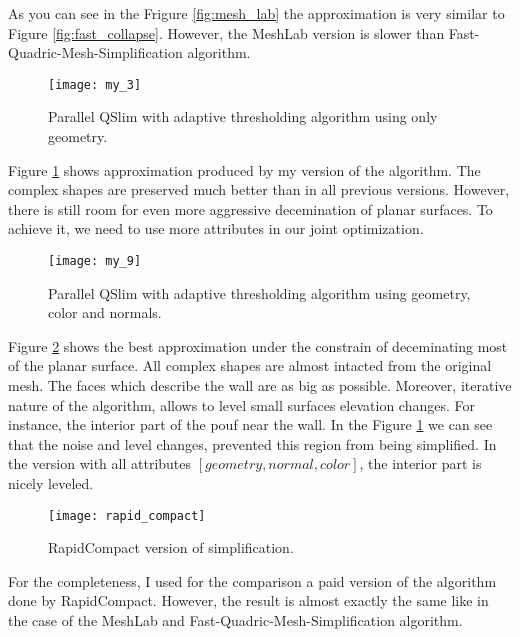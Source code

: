 As you can see in the Frigure \ref{fig:mesh_lab} the approximation is very similar to Figure \ref{fig:fast_collapse}. However, the MeshLab version is slower than Fast-Quadric-Mesh-Simplification algorithm.

\begin{figure}[H]
  \begin{center}
    \texttt{[image: my\_3]}
    \caption{Parallel QSlim with adaptive thresholding algorithm using only geometry.}
    \label{fig:my_3}
  \end{center}
\end{figure}

Figure \ref{fig:my_3} shows approximation produced by my version of the algorithm. The complex shapes are preserved much better than in all previous versions. However, there is still room for even more aggressive decemination of planar surfaces. To achieve it, we need to use more attributes in our joint optimization.

\begin{figure}[H]
  \begin{center}
    \texttt{[image: my\_9]}
    \caption{Parallel QSlim with adaptive thresholding algorithm using geometry, color and normals.}
    \label{fig:my_9}
  \end{center}
\end{figure}

Figure \ref{fig:my_9} shows the best approximation under the constrain of deceminating most of the planar surface. All complex shapes are almost intacted from the original mesh. The faces which describe the wall are as big as possible. Moreover, iterative nature of the algorithm, allows to level small surfaces elevation changes. For instance, the interior part of the pouf near the wall. In the Figure \ref{fig:my_3} we can see that the noise and level changes, prevented this region from being simplified. In the version with all attributes $[geometry, normal, color]$, the interior part is nicely leveled.

\begin{figure}[H]
  \begin{center}
    \texttt{[image: rapid\_compact]}
    \caption{RapidCompact version of simplification.}
    \label{fig:rapid_compact}
  \end{center}
\end{figure}

For the completeness, I used for the comparison a paid version of the algorithm done by RapidCompact. However, the result is almost exactly the same like in the case of the MeshLab and Fast-Quadric-Mesh-Simplification algorithm.
